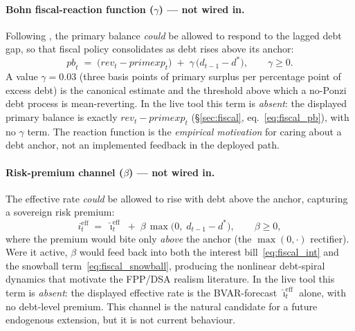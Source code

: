 \documentclass[11pt]{article}
\theoremstyle{definition}
\theoremstyle{remark}
\begin{document}
\paragraph{Bohn fiscal-reaction function ($\gamma$) --- not wired in.}
Following \citet{Bohn1998}, the primary balance \emph{could} be allowed
to respond to the lagged debt gap, so that fiscal policy consolidates as
debt rises above its anchor:
\begin{equation}\label{eq:fiscal_bohn}
  \mathit{pb}_t \;=\; \bigl(\mathit{rev}_t - \mathit{primexp}_t\bigr)
                 \;+\; \gamma\,\bigl(d_{t-1} - d^{*}\bigr),
  \qquad \gamma \ge 0 .
\end{equation}
A value $\gamma = 0.03$ (three basis points of primary surplus per
percentage point of excess debt) is the canonical \citet{Bohn1998}
estimate and the threshold above which a no-Ponzi debt process is
mean-reverting.  In the live tool this term is \emph{absent}: the
displayed primary balance is exactly $\mathit{rev}_t - \mathit{primexp}_t$
(\S\ref{sec:fiscal}, eq.~\eqref{eq:fiscal_pb}), with no $\gamma$ term.
The \citet{Bohn1998} reaction function is the \emph{empirical
motivation} for caring about a debt anchor, not an implemented feedback
in the deployed path.

\paragraph{Risk-premium channel ($\beta$) --- not wired in.}  The
effective rate \emph{could} be allowed to rise with debt above the
anchor, capturing a sovereign risk premium:
\begin{equation}\label{eq:fiscal_riskprem}
  i^{\text{eff}}_t \;=\; \widehat\imath^{\text{eff}}_t
                    \;+\; \beta\,\max\!\bigl(0,\; d_{t-1} - d^{*}\bigr),
  \qquad \beta \ge 0 ,
\end{equation}
where the premium would bite only \emph{above} the anchor (the
$\max(0,\cdot)$ rectifier).  Were it active, $\beta$ would feed back into
both the interest bill~\eqref{eq:fiscal_int} and the snowball
term~\eqref{eq:fiscal_snowball}, producing the nonlinear debt-spiral
dynamics that motivate the FPP/DSA realism literature.  In the live tool
this term is \emph{absent}: the displayed effective rate is the
BVAR-forecast $\widehat\imath^{\text{eff}}_t$ alone, with no debt-level
premium.  This channel is the natural candidate for a future endogenous
extension, but it is not current behaviour.
\end{document}
